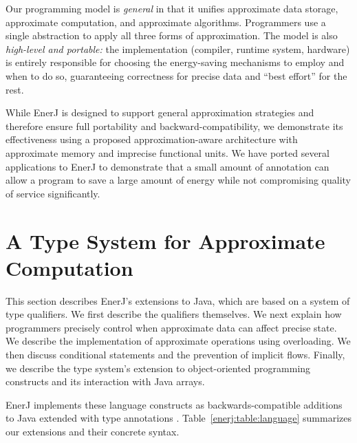 Our programming model is \emph{general} in that it unifies approximate
data storage, approximate computation, and approximate algorithms.
Programmers use a single abstraction to apply all three
forms of approximation.
The model is also \emph{high-level and
portable:} the implementation (compiler, runtime system, hardware)
is entirely responsible for choosing the energy-saving mechanisms to
employ and when to do so, guaranteeing correctness for precise data
and ``best effort'' for the rest.

While EnerJ is designed to support general approximation strategies
and therefore ensure full portability and backward-compatibility, we
demonstrate its effectiveness using a proposed approximation-aware
architecture with approximate memory and imprecise
functional units. We have ported several applications to EnerJ to
demonstrate that a small amount of annotation can allow a program to
save a large amount of energy while not compromising quality of
service significantly.


\section{A Type System for Approximate Computation}
\label{enerj:sec:typesys}

This section describes EnerJ's extensions to Java, which
are based on a system of type qualifiers. We first describe the
qualifiers themselves. We next explain how programmers precisely
control when approximate data can affect
precise state. We describe the implementation of approximate
operations using overloading. We then discuss
conditional statements and the prevention of implicit flows.
Finally, we describe the type system's extension to
object-oriented programming constructs and its interaction with
Java arrays.


EnerJ implements these language constructs as backwards-compatible
additions to Java extended with type
annotations \cite{jsr308}.
Table~\ref{enerj:table:language} summarizes our extensions and their
concrete syntax. %

